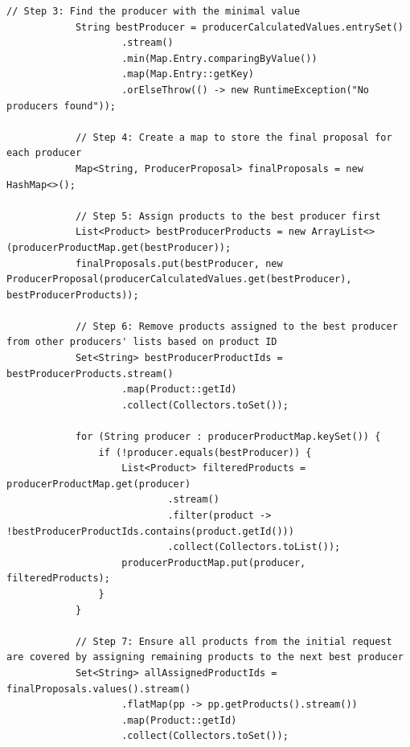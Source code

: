 \begin{lstlisting}[caption=Kod klasy ProposalService, label=ProposalServiceCode]
            // Step 3: Find the producer with the minimal value
            String bestProducer = producerCalculatedValues.entrySet()
                    .stream()
                    .min(Map.Entry.comparingByValue())
                    .map(Map.Entry::getKey)
                    .orElseThrow(() -> new RuntimeException("No producers found"));
    
            // Step 4: Create a map to store the final proposal for each producer
            Map<String, ProducerProposal> finalProposals = new HashMap<>();
    
            // Step 5: Assign products to the best producer first
            List<Product> bestProducerProducts = new ArrayList<>(producerProductMap.get(bestProducer));
            finalProposals.put(bestProducer, new ProducerProposal(producerCalculatedValues.get(bestProducer), bestProducerProducts));
    
            // Step 6: Remove products assigned to the best producer from other producers' lists based on product ID
            Set<String> bestProducerProductIds = bestProducerProducts.stream()
                    .map(Product::getId)
                    .collect(Collectors.toSet());
    
            for (String producer : producerProductMap.keySet()) {
                if (!producer.equals(bestProducer)) {
                    List<Product> filteredProducts = producerProductMap.get(producer)
                            .stream()
                            .filter(product -> !bestProducerProductIds.contains(product.getId()))
                            .collect(Collectors.toList());
                    producerProductMap.put(producer, filteredProducts);
                }
            }
    
            // Step 7: Ensure all products from the initial request are covered by assigning remaining products to the next best producer
            Set<String> allAssignedProductIds = finalProposals.values().stream()
                    .flatMap(pp -> pp.getProducts().stream())
                    .map(Product::getId)
                    .collect(Collectors.toSet());
    

\end{lstlisting}
